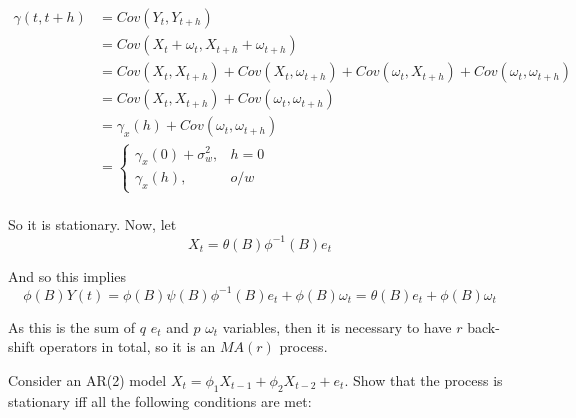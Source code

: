 \documentclass[10pt,a4paper]{exam}
\begin{document}
\begin{questions}
\begin{solution}
\begin{align*}
\gamma(t, t+h)				&= Cov(Y_t, Y_{t+h})\\
									&= Cov(X_t + \omega_t, X_{t+h} + \omega_{t+h})\\
									&= Cov(X_t, X_{t+h}) + Cov(X_t, \omega_{t+h}) + Cov(\omega_t, X_{t+h}) + Cov(\omega_t, \omega_{t+h})\\
									&= Cov(X_t, X_{t+h}) + Cov(\omega_t, \omega_{t+h})\\
									&= \gamma_x(h) + Cov(\omega_t, \omega_{t+h})\\
									&= 	\begin{cases}
												\gamma_x(0) + \sigma_w^2,	& h = 0\\
												\gamma_x(h),	& o/w
											\end{cases}\\
\end{align*}

So it is stationary. Now, let
$$X_t = \theta(B)\phi^{-1}(B)e_t$$

And so this implies
$$\phi(B) Y(t) = \phi(B)\psi(B)\phi^{-1}(B)e_t + \phi(B)\omega_t = \theta(B)e_t + \phi(B) \omega_t$$

As this is the sum of $q$ $e_t$ and $p$ $\omega_t$ variables, then it is necessary to have $r$ back-shift operators in total, so it is an $MA(r)$ process.
\end{solution}








\pagebreak





















\question Consider an AR(2) model $X_t = \phi_1 X_{t-1} + \phi_2 X_{t-2} + e_t$. Show that the process is stationary iff all the following conditions are met:
\end{questions}
\end{document}
